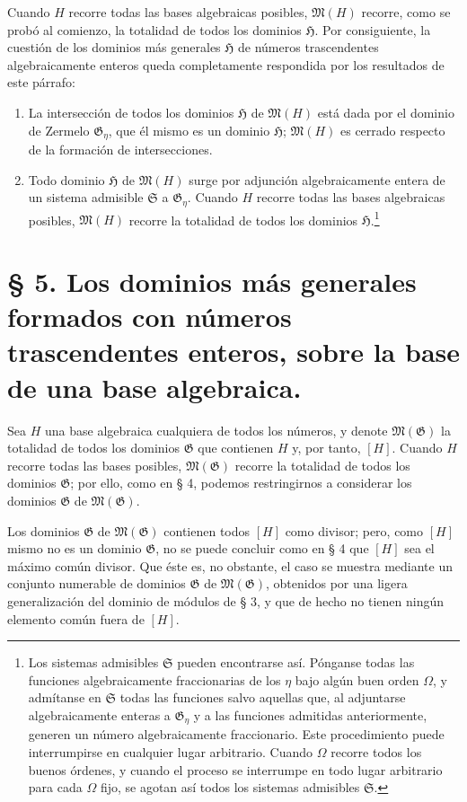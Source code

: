 Cuando $H$ recorre todas las bases algebraicas posibles, $\mathfrak M(H)$ recorre, como se probó al comienzo, la totalidad de todos los dominios $\mathfrak H$. Por consiguiente, la cuestión de los dominios más generales $\mathfrak H$ de números trascendentes algebraicamente enteros queda completamente respondida por los resultados de este párrafo:
\begin{enumerate}
\item[a)] La intersección de todos los dominios $\mathfrak H$ de $\mathfrak M(H)$ está dada por el dominio de Zermelo $\mathfrak G_\eta$, que él mismo es un dominio $\mathfrak H$; $\mathfrak M(H)$ es cerrado respecto de la formación de intersecciones.
\item[b)] Todo dominio $\mathfrak H$ de $\mathfrak M(H)$ surge por adjunción algebraicamente entera de un sistema admisible $\mathfrak S$ a $\mathfrak G_\eta$. Cuando $H$ recorre todas las bases algebraicas posibles, $\mathfrak M(H)$ recorre la totalidad de todos los dominios $\mathfrak H$.\footnote{Los sistemas admisibles $\mathfrak S$ pueden encontrarse así. Pónganse todas las funciones algebraicamente fraccionarias de los $\eta$ bajo algún buen orden $\Omega$, y admítanse en $\mathfrak S$ todas las funciones salvo aquellas que, al adjuntarse algebraicamente enteras a $\mathfrak G_\eta$ y a las funciones admitidas anteriormente, generen un número algebraicamente fraccionario. Este procedimiento puede interrumpirse en cualquier lugar arbitrario. Cuando $\Omega$ recorre todos los buenos órdenes, y cuando el proceso se interrumpe en todo lugar arbitrario para cada $\Omega$ fijo, se agotan así todos los sistemas admisibles $\mathfrak S$.}
\end{enumerate}

\section*{§ 5. Los dominios más generales formados con números trascendentes enteros, sobre la base de una base algebraica.}

Sea $H$ una base algebraica cualquiera de todos los números, y denote $\mathfrak M(\mathfrak G)$ la totalidad de todos los dominios $\mathfrak G$ que contienen $H$ y, por tanto, $[H]$. Cuando $H$ recorre todas las bases posibles, $\mathfrak M(\mathfrak G)$ recorre la totalidad de todos los dominios $\mathfrak G$; por ello, como en § 4, podemos restringirnos a considerar los dominios $\mathfrak G$ de $\mathfrak M(\mathfrak G)$.

Los dominios $\mathfrak G$ de $\mathfrak M(\mathfrak G)$ contienen todos $[H]$ como divisor; pero, como $[H]$ mismo no es un dominio $\mathfrak G$, no se puede concluir como en § 4 que $[H]$ sea el máximo común divisor. Que éste es, no obstante, el caso se muestra mediante un conjunto numerable de dominios $\mathfrak G$ de $\mathfrak M(\mathfrak G)$, obtenidos por una ligera generalización del dominio de módulos de § 3, y que de hecho no tienen ningún elemento común fuera de $[H]$.

